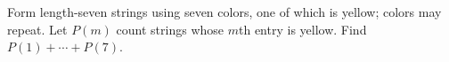 Form length-seven strings using seven colors, one of which is yellow; colors may repeat. Let $P(m)$ count strings whose $m$th entry is yellow. Find $P(1)+\cdots+P(7)$.
